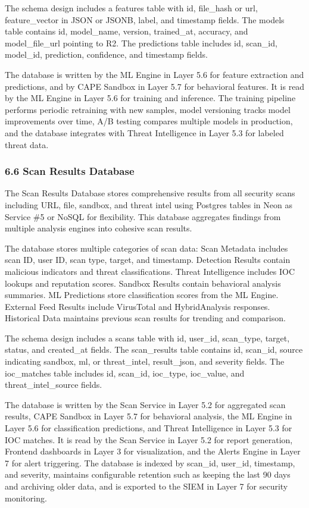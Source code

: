 \documentclass[12pt,a4paper]{report}
\begin{document}
The schema design includes a features table with id, file\_hash or url, feature\_vector in JSON or JSONB, label, and timestamp fields. The models table contains id, model\_name, version, trained\_at, accuracy, and model\_file\_url pointing to R2. The predictions table includes id, scan\_id, model\_id, prediction, confidence, and timestamp fields.

The database is written by the ML Engine in Layer 5.6 for feature extraction and predictions, and by CAPE Sandbox in Layer 5.7 for behavioral features. It is read by the ML Engine in Layer 5.6 for training and inference. The training pipeline performs periodic retraining with new samples, model versioning tracks model improvements over time, A/B testing compares multiple models in production, and the database integrates with Threat Intelligence in Layer 5.3 for labeled threat data.

\subsubsection{6.6 Scan Results Database}

The Scan Results Database stores comprehensive results from all security scans including URL, file, sandbox, and threat intel using Postgres tables in Neon as Service \#5 or NoSQL for flexibility. This database aggregates findings from multiple analysis engines into cohesive scan results.

The database stores multiple categories of scan data: Scan Metadata includes scan ID, user ID, scan type, target, and timestamp. Detection Results contain malicious indicators and threat classifications. Threat Intelligence includes IOC lookups and reputation scores. Sandbox Results contain behavioral analysis summaries. ML Predictions store classification scores from the ML Engine. External Feed Results include VirusTotal and HybridAnalysis responses. Historical Data maintains previous scan results for trending and comparison.

The schema design includes a scans table with id, user\_id, scan\_type, target, status, and created\_at fields. The scan\_results table contains id, scan\_id, source indicating sandbox, ml, or threat\_intel, result\_json, and severity fields. The ioc\_matches table includes id, scan\_id, ioc\_type, ioc\_value, and threat\_intel\_source fields.

The database is written by the Scan Service in Layer 5.2 for aggregated scan results, CAPE Sandbox in Layer 5.7 for behavioral analysis, the ML Engine in Layer 5.6 for classification predictions, and Threat Intelligence in Layer 5.3 for IOC matches. It is read by the Scan Service in Layer 5.2 for report generation, Frontend dashboards in Layer 3 for visualization, and the Alerts Engine in Layer 7 for alert triggering. The database is indexed by scan\_id, user\_id, timestamp, and severity, maintains configurable retention such as keeping the last 90 days and archiving older data, and is exported to the SIEM in Layer 7 for security monitoring.
\end{document}
